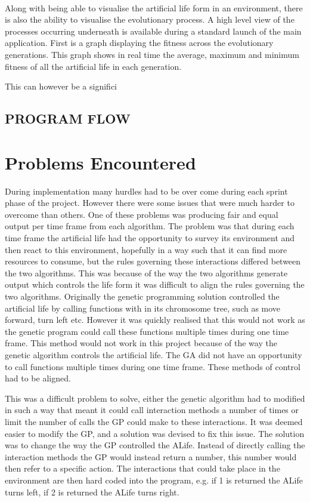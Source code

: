 \documentclass[12pt]{article}
\begin{document}
\paragraph{}
Along with being able to visualise the artificial life form in an environment, there is also the ability to visualise the
evolutionary process. A high level view of the processes occurring underneath is available during a standard launch of the
main application. First is a graph displaying the fitness across the evolutionary generations. This graph shows in real time the
average, maximum and minimum fitness of all the artificial life in each generation.

This can however be a significi

\subsection{PROGRAM FLOW}

\section{Problems Encountered}

During implementation many hurdles had to be over come during each sprint phase of the project. However there were some issues that were much harder to overcome than others. One of these problems was
producing fair and equal output per time frame from each algorithm. The problem was that during each time frame the artificial life had the opportunity to survey its environment and then react to this
environment, hopefully in a way such that it can find more resources to consume, but the rules governing these interactions differed between the two algorithms.
This was because of the way the two algorithms generate output which controls the life form it was difficult to align
the rules governing the two algorithms. Originally the genetic programming solution controlled the artificial life by calling functions with in its chromosome tree, such as move forward, turn left etc.
However it was quickly realised that this would not work as the genetic program could call these functions multiple times during one time frame. This method would not work in this project because
of the way the genetic algorithm controls the artificial life. The GA did not have an opportunity to call functions multiple times during one time frame. These methods of control had to be aligned. 

This was a difficult problem to solve, either the genetic algorithm had to modified in such a way that meant it could call interaction methods
a number of times or limit the number of calls the GP could make to these interactions. It was deemed easier to modify the GP, and a solution
was devised to fix this issue. The solution was to change the way the GP controlled the ALife. Instead of directly calling the interaction methods
the GP would instead return a number, this number would then refer to a specific action. The interactions that could take place in 
the environment are then hard coded into the program, e.g. if 1 is returned the ALife turns left, if 2 is returned the ALife turns right.
\end{document}
